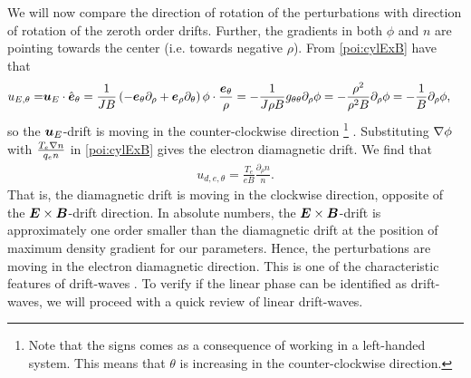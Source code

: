We will now compare the direction of rotation of the perturbations with direction of rotation of the zeroth order drifts.
Further, the gradients in both $\phi$ and $n$ are pointing towards the center (i.e. towards negative $\rho$).
From \cref{poi:cylExB} have that
%
\begin{align*}
    u_{E,\theta} =& \boldsymbol{u}_{E}\cdot\hat{\boldsymbol{e}}_\theta
    =
     \frac{1}{JB}
           \left(
           - \boldsymbol{e}_\theta\partial_\rho
           + \boldsymbol{e}_\rho\partial_\theta
           \right)
           \phi
    \cdot
    \frac{\boldsymbol{e}_\theta}{\rho}
    =
     - \frac{1}{J\rho B} g_{\theta\theta} \partial_\rho \phi
    =
     - \frac{\rho^2}{\rho^2 B} \partial_\rho \phi
    =
     - \frac{1}{B} \partial_\rho \phi,
\end{align*}
%
so the $\boldsymbol{u}_E$-drift is moving in the counter-clockwise direction%
\footnote{
Note that the signs comes as a consequence of working in a left-handed system.
This means that $\theta$ is increasing in the counter-clockwise direction.
}%
%
.
Substituting $\nabla\phi$ with $\frac{T_e\nabla n}{q_en}$ in \cref{poi:cylExB} gives the electron diamagnetic drift.
We find that
%
\begin{align*}
    u_{d,e,\theta}= \frac{T_e}{eB} \frac{\partial_\rho n}{n}.
\end{align*}
%
That is, the diamagnetic drift is moving in the clockwise direction, opposite of the $\boldsymbol{E}\times\boldsymbol{B}$-drift direction.
In absolute numbers, the $\boldsymbol{E}\times\boldsymbol{B}$-drift is approximately one order smaller than the diamagnetic drift at the position of maximum density gradient for our parameters.
Hence, the perturbations are moving in the electron diamagnetic direction.
This is one of the characteristic features of drift-waves \cite{Jassby1972}.
To verify if the linear phase can be identified as drift-waves, we will proceed with a quick review of linear drift-waves.

